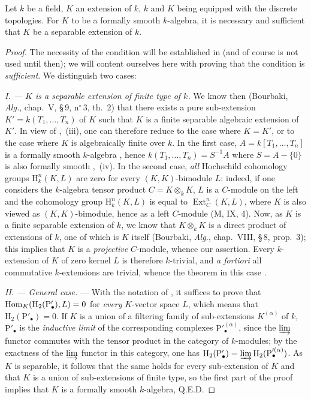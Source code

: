 \begin{theorem}[19.6.1][Cohen]
\label{0.19.6.1}
Let $k$ be a field, $K$ an extension of $k$, $k$ and $K$ being equipped with the discrete topologies.
For $K$ to be a formally smooth $k$-algebra, it is necessary and sufficient that $K$ be a separable extension of $k$.
\end{theorem}

\begin{proof}
The necessity of the condition will be established in  (and of course is not used until then);
we will content ourselves here with proving that the condition is \emph{sufficient}.
We distinguish two cases:

\emph{I. --- $K$ is a separable extension of finite type of $k$.}
We know then (Bourbaki, \emph{Alg.}, chap.~V, \S\,9, n$^\circ$\,3, th.~2) that there exists a pure sub-extension $K'=k(T_1,\ldots,T_n)$ of $K$ such that $K$ is a finite separable algebraic extension of $K'$.
  In view of ,~(iii), one can therefore reduce to the case where $K=K'$, or to the case where $K$ is algebraically finite over $k$.
In the first case, $A=k[T_1,\ldots,T_n]$ is a formally smooth $k$-algebra , hence $k(T_1,\ldots,T_n)=S^{-1}A$ where $S=A-\{0\}$ is also formally smooth ,~(iv).
In the second case, \emph{all} Hochschild cohomology groups $\mathrm{H}^n_k(K,L)$ are zero for every $(K,K)$-bimodule $L$:
indeed, if one considers the $k$-algebra tensor product $C=K\otimes_k K$, $L$ is a $C$-module on the left and the cohomology group $\mathrm{H}^n_k(K,L)$ is equal to $\operatorname{Ext}^n_C(K,L)$, where $K$ is also viewed as $(K,K)$-bimodule,
hence as a left $C$-module (M, IX, 4).
Now, as $K$ is a finite separable extension of $k$, we know that $K\otimes_k K$ is a direct product of extensions of $k$, one of which is $K$ itself (Bourbaki, \emph{Alg.}, chap.~VIII, \S\,8, prop.~3);
this implies that $K$ is a \emph{projective} $C$-module, whence our assertion.
Every $k$-extension of $K$ of zero kernel $L$ is therefore $k$-trivial, and \emph{a fortiori} all commutative $k$-extensions are trivial, whence the theorem in this case .

\emph{II. --- General case.} ---
With the notation of , it suffices to prove that $\operatorname{Hom}_K(\mathrm{H}_2(\mathrm{P}'_\bullet),L)=0$ for \emph{every} $K$-vector space $L$, which means that $\mathrm{H}_2(\mathrm{P}'_\bullet)=0$.
If $K$ is a union of a filtering family of sub-extensions $K^{(\alpha)}$ of $k$, $\mathrm{P}'_\bullet$ is the \emph{inductive limit} of the corresponding complexes $\mathrm{P}'^{(\alpha)}_\bullet$, since the $\varinjlim$ functor commutes with the tensor product in the category of $k$-modules;
by the exactness of the $\varinjlim$ functor in this category, one has $\mathrm{H}_2(\mathrm{P}'_\bullet)=\varinjlim\mathrm{H}_2(\mathrm{P}'^{(\alpha)}_\bullet)$.
As $K$ is separable, it follows that the same holds for every sub-extension of $K$ and that $K$ is a union of sub-extensions of finite type, so the first part of the proof implies that $K$ is a formally smooth $k$-algebra, Q.E.D.
\end{proof}

